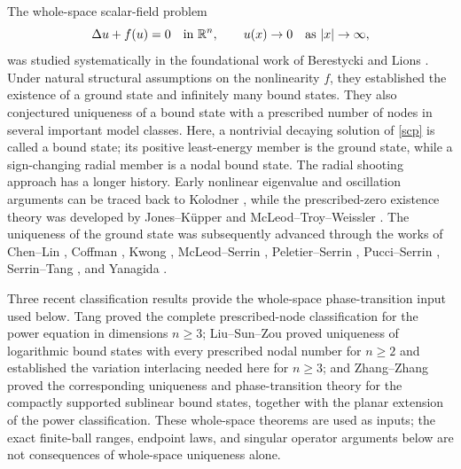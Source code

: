 \documentclass[11pt]{article}
\begin{document}
The whole-space scalar-field problem
 \begin{equation}\label{scp}
 \Delta u+f(u)=0\quad\hbox{in }\mathbb R^n,
 \qquad u(x)\to0\quad\hbox{as }|x|\to\infty,
 \end{equation}
was studied systematically in the foundational work of Berestycki and Lions
\cite{BL1,BL2}.  {Under natural structural assumptions on the nonlinearity $f$, they established
the existence of a ground state and infinitely many bound states. They also
conjectured uniqueness of a bound state with a prescribed number of nodes in
several important model classes. Here, a nontrivial decaying solution of
\eqref{scp} is called a bound state; its positive least-energy member is the
ground state, while a sign-changing radial member is a nodal bound state. The
radial shooting approach has a longer history. Early
nonlinear eigenvalue and oscillation arguments can be traced back to Kolodner
\cite{Kolodner}, while the prescribed-zero existence theory was developed by}
Jones--K\"upper \cite{JonesKupper} and McLeod--Troy--Weissler
\cite{MTW}.
The uniqueness of the ground state was subsequently advanced through the works of
Chen--Lin \cite{ChenLin}, Coffman \cite{Coffman,Coffman96}, Kwong
\cite{Kwong,KZ91},  McLeod--Serrin \cite{McLeodSerrin},  Peletier--Serrin \cite{PeletierSerrin},  Pucci--Serrin \cite{PucciSerrin98}, Serrin--Tang
\cite{SerrinTang}, and Yanagida \cite{Y91}.

{Three recent classification results provide the whole-space
phase-transition input used below. Tang \cite{Tang} proved the complete
prescribed-node classification for the power equation in dimensions $n\ge3$;
Liu--Sun--Zou \cite{LiuSunZou} proved uniqueness of logarithmic bound states
with every prescribed nodal number for $n\ge2$ and established the variation
interlacing needed here for $n\ge3$; and Zhang--Zhang \cite{ZhangZhang}
proved the corresponding uniqueness and phase-transition theory for the
compactly supported sublinear bound states, together with the planar extension
of the power classification.  These whole-space theorems are used as inputs;
the exact finite-ball ranges, endpoint laws, and singular operator arguments
below are not consequences of whole-space uniqueness alone.}
\end{document}
